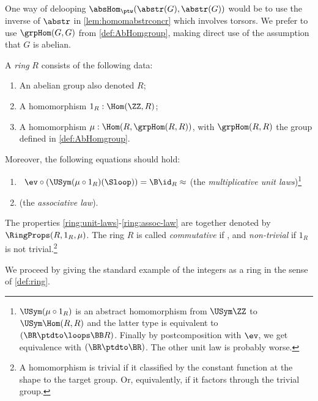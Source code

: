One way of delooping $\absHom_{\ptw}(\abstr(G),\abstr(G))$ would be
to use the inverse of $\abstr$ in \cref{lem:homomabstrconcr}
which involves torsors.  
We prefer to use $\grpHom(G,G)$ from \cref{def:AbHomgroup},
making direct use of the assumption that $G$ is abelian.


\begin{definition}\label{def:ring}
A \emph{ring} $R$ consists of the following data:
\begin{enumerate}
\item An abelian group also denoted $R$;
\item A homomorphism $1_R:\Hom(\ZZ,R)$;
\item A homomorphism $\mu: \Hom(R,\grpHom(R,R))$, with $\grpHom(R,R)$
the group defined in \cref{def:AbHomgroup}.
\end{enumerate}
Moreover, the following equations should hold:
    \begin{enumerate}
    \item\label{ring:unit-laws}\
    $\ev\circ(\USym(\mu\circ{1_R})(\Sloop)) = \B\id_R \approx \MB{TBD}$ 
    (the \emph{multiplicative unit laws})\footnote{%
 $\USym(\mu\circ{1_R})$ is an abstract homomorphism
from $\USym\ZZ$ to $\USym\Hom(R,R)$ and the latter type
is equivalent to $(\BR\ptdto\loops\BB R)$. Finally by postcomposition
with $\ev$, we get equivalence with $(\BR\ptdto\BR)$.
The other unit law is probably worse.}
    \item\label{ring:assoc-law}  (the \emph{associative law}). %
    \end{enumerate}
The properties \ref{ring:unit-laws}-\ref{ring:assoc-law} 
are together denoted by $\RingProps(R,1_R,\mu)$.
The ring $R$ is called \emph{commutative} if , 
and \emph{non-trivial} if $1_R$ is not trivial.\footnote{%
A homomorphism is trivial if it classified by the constant function
at the shape to the target group. Or, equivalently, if it factors
through the trivial group.}
\end{definition}

We proceed by giving the standard example of the integers as a ring
in the sense of \cref{def:ring}.


